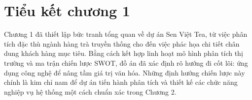 \section*{Tiểu kết chương 1}
Chương 1 đã thiết lập bức tranh tổng quan về dự án Sen Việt Tea, từ việc phân tích đặc thù ngành hàng trà truyền thống cho đến việc phác họa chi tiết chân dung khách hàng mục tiêu. Bằng cách kết hợp linh hoạt mô hình phân tích thị trường và ma trận chiến lược SWOT, đồ án đã xác định rõ hướng đi cốt lõi: ứng dụng công nghệ để nâng tầm giá trị văn hóa. Những định hướng chiến lược này chính là kim chỉ nam để dự án tiến hành phân tích và thiết kế các chức năng nghiệp vụ hệ thống một cách chuẩn xác trong Chương 2.